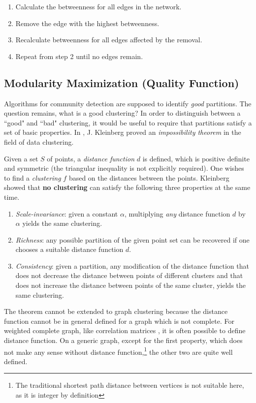 \begin{enumerate}
	\item Calculate the betweenness for all edges in the network.
	\item Remove the edge with the highest betweenness.
	\item Recalculate betweenness for all edges affected by the removal.
	\item Repeat from step 2 until no edges remain.
\end{enumerate}

\subsection{Modularity Maximization (Quality Function)}
Algorithms for community detection are supposed to identify \textit{good} partitions. The question remains, what is a good clustering? In order to distinguish between a ``good" and ``bad" clustering, it would be useful to require that partitions satisfy a set of basic properties. In \cite{ref-14}, J. Kleinberg proved an \textit{impossibility theorem} in the field of data clustering.

Given a set $S$ of points, a \textit{distance function} $d$ is defined, which is positive definite and symmetric (the triangular inequality is not explicitly required). One wishes to find a \textit{clustering} $f$ based on the distances between the points. Kleinberg showed that \textbf{no clustering} can satisfy the following three properties at the same time.

\begin{enumerate}
	\item \textit{Scale-invariance}: given a constant $\alpha$, multiplying \textit{any} distance function $d$ by $\alpha$ yields the same clustering.
	\item \textit{Richness}: any possible partition of the given point set can be recovered if one chooses a suitable distance function $d$.
	\item \textit{Consistency}: given a partition, any modification of the distance function that does not decrease the distance between points of different clusters and that does not increase the distance between points of the same cluster, yields the same clustering.
\end{enumerate}

The theorem cannot be extended to graph clustering because the distance function cannot be in general defined for a graph which is not complete. For weighted complete graph, like  correlation matrices \cite{ref-15}, it is often possible to define distance function. On a generic graph, except for the first property, which does not make any sense without distance function,\footnote{The traditional shortest path distance between vertices is not suitable here, as it is integer by definition} the other two are quite well defined.

